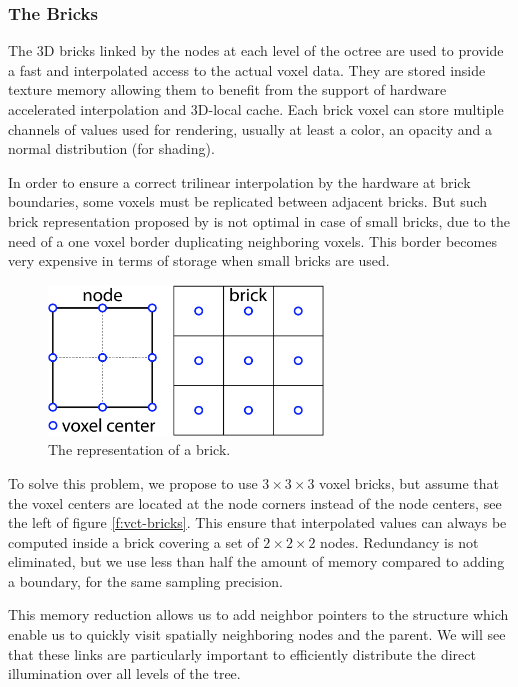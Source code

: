 \subsubsection{The Bricks}
The 3D bricks linked by the nodes at each level of the octree are used to provide a fast and interpolated access to the actual voxel data. They are stored inside texture memory allowing them to benefit from the support of hardware accelerated interpolation and 3D-local cache. Each brick voxel can store multiple channels of values used for rendering, usually at least a color, an opacity and a normal distribution (for shading). 

In order to ensure a correct trilinear interpolation by the hardware at brick boundaries, some voxels must be replicated between adjacent bricks. But such brick representation proposed by \cite{a:InteractiveIndirectIlluminationUsingVoxelConeTracing} is not optimal in case of small bricks, due to the need of a one voxel border duplicating neighboring voxels. This border becomes very expensive in terms of storage when small bricks are used.

\begin{figure}
	\sidecaption
	\includegraphics[width=0.65\textwidth]{graphics/vct/vct-13-11}
	\caption{The representation of a brick.}
\end{figure}

To solve this problem, we propose to use $3\times 3\times 3$ voxel bricks, but assume that the voxel centers are located at the node corners instead of the node centers, see the left of figure \ref{f:vct-bricks}. This ensure that interpolated values can always be computed inside a brick covering a set of $2\times 2\times 2$ nodes. Redundancy is not eliminated, but we use less than half the amount of memory compared to adding a boundary, for the same sampling precision. 

This memory reduction allows us to add neighbor pointers to the structure which enable us to quickly visit spatially neighboring nodes and the parent. We will see that these links are particularly important to efficiently distribute the direct illumination over all levels of the tree.




